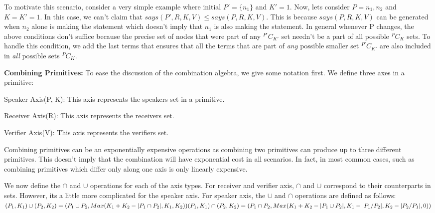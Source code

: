 To motivate this scenario, consider a very simple example where initial $P'=\{n_{1}\}$ and $K'=1$. Now, lets consider $P={n_{1}, n_{2}}$ and $K=K'=1$. In this case, we can't claim that $says(P', R, K, V) \leq says(P, R, K, V)$. This is because $says(P, R, K, V)$ can be generated when $n_{2}$ alone is making the statement which doesn't imply that $n_{1}$ is also making the statement. In general whenever P changes, the above conditions don't suffice because the precise set of nodes that were part of any $^{P'}C_{K'}$ set needn't be a part of all possible $^{P}C_{K}$ sets. To handle this condition, we add the last terms that ensures that all the terms that are part of {\em any} possible smaller set $^{P'}C_{K'}$ are also included in {\em all} possible sets $^{P}C_{K}$.

{\bf Combining Primitives:} To ease the discussion of the combination algebra, we give some notation first. We define three axes in a primitive:
\be
\item Speaker Axis(P, K): This axis represents the speakers set in a primitive.
\item Receiver Axis(R): This axis represents the receivers set.
\item Verifier Axis(V): This axis represents the verifiers set.
\ee



Combining primitives can be an exponentially expensive operations as combining two primitives can produce up to three different primitives. This doesn't imply that the combination will have exponential cost in all scenarios. In fact, in most common cases, such as combining primitives which differ only along one axis is only linearly expensive.

We now define the $\cap$ and $\cup$ operations for each of the axis types. For receiver and verifier axis, $\cap$ and $\cup$ correspond to their counterparts in sets. However, its a little more complicated for the speaker axis. For speaker axis, the $\cup$ and $\cap$ operations are defined as follows:\\
\begin{math}
(P_{1}, K_{1}) \cup (P_{2}, K_{2}) = \\ (P_{1} \cup P_{2}, Max(K_{1}+K_{2}-|P_{1} \cap P_{2}|, K_{1}, K_{2}))\\
(P_{1}, K_{1}) \cap (P_{2}, K_{2}) = \\ (P_{1} \cap P_{2}, Max(K_{1}+K_{2}-|P_{1} \cup P_{2}|, K_{1} - |P_{1}/P_{2}|, K_{2} - |P_{2}/P_{1}|, 0))\\
\end{math} 

